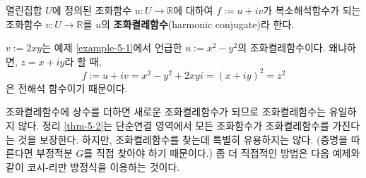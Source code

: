 \begin{saltdefinition} {}{} \label{def-5-2}
열린집합 $U$에 정의된 조화함수 $u:U \to \mathbb R$에 대하여
$f:=u+iv$가 복소해석함수가 되는 조화함수 $v:U \to \mathbb R$를
$u$의 {\bf 조화켤레함수}(harmonic conjugate)라 한다.
\end{saltdefinition}

\begin{saltexample}[label=example-5-4]{}{}
$v:=2xy$는 예제 \ref{example-5-1}에서 언급한 $u:=x^2-y^2$의 조화켤레함수이다.
왜냐하면, $z=x+iy$라 할 때,
\[
f:= u+iv = x^2-y^2 + 2xyi = (x+iy)^2 = z^2
\]
은 전해석 함수이기 때문이다.
\end{saltexample}

조화켤레함수에 상수를 더하면 새로운 조화켤레함수가 되므로 
조화켤레함수는 유일하지 않다.
정리 \ref{thm-5-2}는 단순연결 영역에서 모든 조화함수가
조화켤레함수를 가진다는 것을 보장한다.
하지만, 조화켤레함수를 찾는데 특별히 유용하지는 않다.
(증명을 따른다면 부정적분 $G$를 직접 찾아야 하기 때문이다.)
좀 더 직접적인 방법은 다음 예제와 같이 코시-리만 방정식을 이용하는 것이다.

